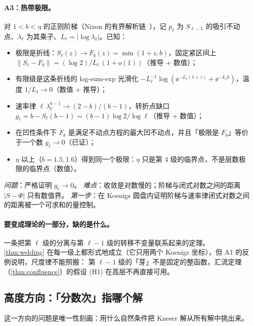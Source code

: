 \paragraph{A3：热带极限。}对 $1<b<\eta$ 的正则阶梯（Nixon 的有界解析链~\cite{Nixon2022}），记 $p_\ell$ 为 $S_{\ell-1}$ 的吸引不动点、$\lambda_\ell$ 为其乘子、$L_\ell=|\log\lambda_\ell|$。已知：
\begin{itemize}
\item 极限是折线：$S_\ell(z)\to F_b(z)=\min(1+z,b)$，固定紧区间上 $\|S_\ell-F_b\|=(\log2)/L_\ell\,(1+o(1))$（推导 + 数值）；
\item 有限级是这条折线的 log-sum-exp 光滑化 $-L_\ell^{-1}\log(\ee^{-L_\ell(1+z)}+\ee^{-L_\ell b})$，温度 $1/L_\ell\to0$（数值 + 推导）；
\item 速率律 $\ell\,\lambda_\ell^{b-1}\to(2-b)/(b-1)$，转折点缺口 $g_\ell=b-S_\ell(b-1)\sim(b-1)\log2/\log\ell$（推导 + 数值）；
\item 在凹性条件下 $F_b$ 是满足不动点方程的最大凹不动点，并且「极限是 $F_b$」等价于一个数 $g_\ell\to0$（已证）；
\item $\eta$ 以上（$b=1.5,1.6$）得到同一个极限：$\eta$ 只是第 4 级的临界点，不是层数极限的临界点（数值）。
\end{itemize}
\emph{问题}：严格证明 $g_\ell\to0$。
\emph{难点}：收敛是对数慢的；阶梯与闭式对数之间的距离 $|S-\Phi|$ 只有数值界。
\emph{第一步}：在 Koenigs 圆盘内证明阶梯与速率律闭式对数之间的距离被一个可求和的量控制。

\paragraph{要变成理论的一部分，缺的是什么。}一条把第 $\ell$ 级的分离与第 $\ell-1$ 级的转移不变量联系起来的定理。
\cref{thm:welding} 在每一级上都形式地成立（它只用两个 Koenigs 坐标），但 A1 的反例说明，尺度律不能照搬：
第 $\ell-1$ 级的「芽」不是固定的整函数，汇流定理（\cref{thm:confluence}）的假设 (H1) 在高层不再直接可用。

\subsection{高度方向：「分数次」指哪个解}\label{ch12:sec:height}

这一方向的问题是唯一性刻画：用什么自然条件把 Kneser 解从所有解中挑出来。

